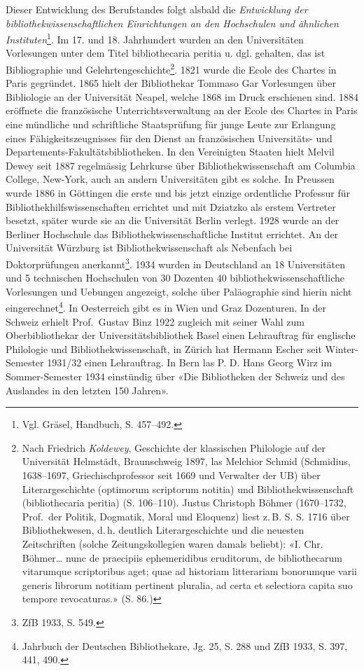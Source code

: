\documentclass[a4paper,
fontsize=11pt,
oneside,
numbers=noperiodatend,
parskip=half-,
bibliography=totoc,
final
]{scrartcl}
\begin{document}
Dieser Entwicklung des Berufstandes folgt alsbald die \emph{Entwicklung
der bibliothekwissenschaftlichen Einrichtungen an den Hochschulen und
ähnlichen Instituten}\footnote{Vgl. Gräsel, Handbuch, S. 457--492.}. Im
17. und 18. Jahrhundert wurden an den Universitäten Vorlesungen unter
dem Titel bibliothecaria peritia u. dgl. gehalten, das ist Bibliographie
und Gelehrtengeschichte\footnote{Nach Friedrich \emph{Koldewey},
  Geschichte der klassischen Philologie auf der Universität Helmstädt,
  Braunschweig 1897, las Melchior Schmid (Schmidius, 1638--1697,
  Griechischprofessor seit 1669 und Verwalter der UB) über
  Literargeschichte (optimorum scriptorum notitia) und
  Bibliothekwissenschaft (bibliothecaria peritia) (S. 106--110). Justus
  Christoph Böhmer (1670--1732, Prof.~der Politik, Dogmatik, Moral und
  Eloquenz) liest z.\,B. S. S. 1716 über Bibliothekwesen, d.\,h.
  deutlich Literargeschichte und die neuesten Zeitschriften (solche
  Zeitungskollegien waren damals beliebt): «I. Chr. Böhmer\ldots{} nunc
  de praecipiis ephemeridibus eruditorum, de bibliothecarum vitarumque
  scriptoribus aget; quae ad historiam litterariam bonorumque varii
  generis librorum notitiam pertinent pluralia, ad certa et selectiora
  capita suo tempore revocaturas.» (S. 86.)}. 1821 wurde die Ecole des
Chartes in Paris gegründet. 1865 hielt der Bibliothekar Tommaso Gar
Vorlesungen über Bibliologie an der Universität Neapel, welche 1868 im
Druck erschienen sind. 1884 eröffnete die französische
Unterrichtsverwaltung an der Ecole des Chartes in Paris eine mündliche
und schriftliche Staatsprüfung für junge Leute zur Erlangung eines
Fähigkeitszeugnisses für den Dienst an französischen Universitäts- und
Departements-Fakultätsbibliotheken. In den Vereinigten Staaten hielt
Melvil Dewey seit 1887 regelmässig Lehrkurse über Bibliothekwissenschaft
am Columbia College, New-York, auch an andern Universitäten gibt es
solche. In Preussen wurde 1886 in Göttingen die erste und bis jetzt
einzige ordentliche Professur für Bibliothekhilfswissenschaften
errichtet und mit Dziatzko als erstem Vertreter besetzt, später wurde
sie an die Universität Berlin verlegt. 1928 wurde an der Berliner
Hochschule das Bibliothekwissenschaftliche Institut errichtet. An der
Universität Würzburg ist Bibliothekwissenschaft als Nebenfach bei
Doktorprüfungen anerkannt\footnote{ZfB 1933, S. 549.}. 1934 wurden in
Deutschland an 18 Universitäten und 5 technischen Hochschulen von 30
Dozenten 40 bibliothekwissenschaftliche Vorlesungen und Uebungen
angezeigt, solche über Paläographie sind hierin nicht
eingerechnet\footnote{Jahrbuch der Deutschen Bibliothekare, Jg. 25, S.
  288 und ZfB 1933, S. 397, 441, 490.}. In Oesterreich gibt es in Wien
und Graz Dozenturen. In der Schweiz erhielt Prof.~Gustav Binz 1922
zugleich mit seiner Wahl zum Oberbibliothekar der Universitätsbibliothek
Basel einen Lehrauftrag für englische Philologie und
Bibliothekwissenschaft, in Zürich hat Hermann Escher seit
Winter-Semester 1931/32 einen Lehrauftrag. In Bern las P. D. Hans Georg
Wirz im Sommer-Semester 1934 einstündig über «Die Bibliotheken der
Schweiz und des Auslandes in den letzten 150 Jahren».
\end{document}
